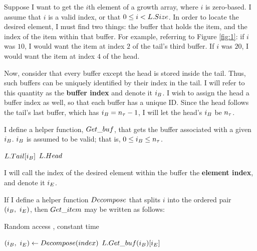 Suppose I want to get the $i$th element of a growth array, where $i$ is zero-based. I assume that $i$ is a valid index, or that $0 \leq i < L.Size$. In order to locate the desired element, I must find two things: the buffer that holds the item, and the index of the item within that buffer. For example, referring to Figure \ref{fig:1}: if $i$ was $10$, I would want the item at index $2$ of the tail's third buffer. If $i$ was $20$, I would want the item at index $4$ of the head.

Now, consider that every buffer except the head is stored inside the tail. Thus, such buffers can be uniquely identified by their index in the tail. I will refer to this quantity as the \textbf{buffer index} and denote it $i_B$. I wish to assign the head a buffer index as well, so that each buffer has a unique ID. Since the head follows the tail's last buffer, which has $i_B = n_\tau - 1$, I will let the head's $i_B$ be $n_\tau$.

I define a helper function, $\FuncGetBuffer$, that gets the buffer associated with a given $i_B$. $i_B$ is assumed to be valid; that is, $0 \leq i_B \leq n_\tau$.

\begin{algorithm}[H]
	\caption{\TextHelperFunction}
	\begin{algorithmic}
		\Function{$\FuncGetBuffer$}{$\VarList,\ \LclIndexBuffer$}
				\State \Return $L.Tail[i_B]$
			\Else
				\State \Return $L.Head$
			\EndIf
		\EndFunction
	\end{algorithmic}
\end{algorithm}

I will call the index of the desired element within the buffer the \textbf{element index}, and denote it $i_E$.

If I define a helper function $Decompose$ that splits $i$ into the ordered pair $(\VarIndexBuffer,\ \VarIndexElement)$, then $\FuncGetItem$ may be written as follows:

\begin{algorithm}[H]
	\caption{Random access \TextGrowthArray, constant time}
	\begin{algorithmic}
		\Function{$\FuncGetItem$}{$\VarList,\ \ParamIndex$}
			\State $(i_B,\ i_E) \gets Decompose(index)$
			\State \Return $L.Get\_buf(i_B)[i_E]$
		\EndFunction
	\end{algorithmic}
\end{algorithm}

